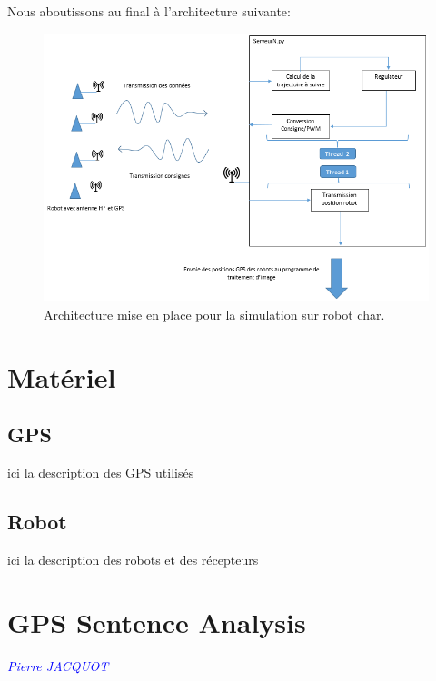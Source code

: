 \documentclass[10pt,a4paper]{report}
\begin{document}
\medskip

Nous aboutissons au final à l'architecture suivante:

\bigskip

\begin{figure}[ht]
\centering
    \includegraphics[scale=0.8,angle=0]{SyntheseExp.png}
    \caption{Architecture mise en place pour la simulation sur robot char.}
    \label{fig:SyntheseExp}
\end{figure}

\bigskip

\section{Matériel}
\subsection{GPS}
ici la description des GPS utilisés


\subsection{Robot}
ici la description des robots et des récepteurs

\section{GPS Sentence Analysis}
\textcolor{blue}{\textit{Pierre JACQUOT}}
\end{document}
